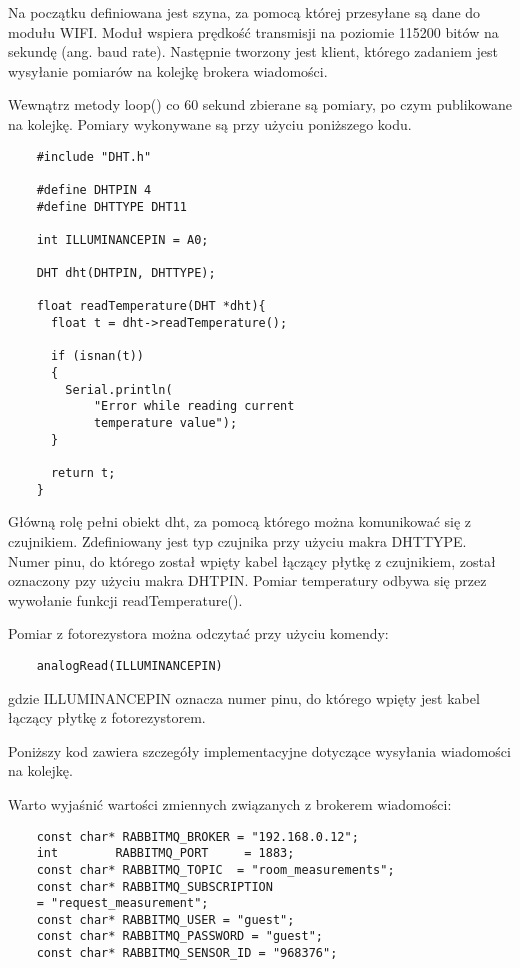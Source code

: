 Na początku definiowana jest szyna, za pomocą której przesyłane są dane do 
modułu WIFI. Moduł wspiera prędkość transmisji na poziomie 115200 bitów na 
sekundę (ang. baud rate). Następnie tworzony jest klient, którego zadaniem
jest wysyłanie pomiarów na kolejkę brokera wiadomości. 

Wewnątrz metody loop() co 60 sekund zbierane są pomiary, po czym publikowane
na kolejkę. Pomiary wykonywane są przy użyciu poniższego kodu.

\begin{lstlisting}
    #include "DHT.h"

    #define DHTPIN 4
    #define DHTTYPE DHT11
    
    int ILLUMINANCEPIN = A0;
    
    DHT dht(DHTPIN, DHTTYPE);
    
    float readTemperature(DHT *dht){
      float t = dht->readTemperature();
     
      if (isnan(t))
      {
        Serial.println(
            "Error while reading current 
            temperature value");
      }
      
      return t;
    }
\end{lstlisting}

Główną rolę pełni obiekt dht, za pomocą którego można komunikować się
z czujnikiem. Zdefiniowany jest typ czujnika przy użyciu makra DHTTYPE.
Numer pinu, do którego został wpięty kabel łączący płytkę z czujnikiem,
został oznaczony pzy użyciu makra DHTPIN. Pomiar temperatury odbywa się
przez wywołanie funkcji readTemperature(). 

Pomiar z fotorezystora można odczytać przy użyciu komendy:  

\begin{lstlisting}
    analogRead(ILLUMINANCEPIN)
\end{lstlisting}

gdzie ILLUMINANCEPIN oznacza numer pinu, do 
którego wpięty jest kabel łączący płytkę z fotorezystorem.

Poniższy kod zawiera szczegóły implementacyjne dotyczące 
wysyłania wiadomości na kolejkę.



Warto wyjaśnić wartości zmiennych związanych z brokerem wiadomości:
\begin{lstlisting}
    const char* RABBITMQ_BROKER = "192.168.0.12";
    int        RABBITMQ_PORT     = 1883;
    const char* RABBITMQ_TOPIC  = "room_measurements";
    const char* RABBITMQ_SUBSCRIPTION  
    = "request_measurement";
    const char* RABBITMQ_USER = "guest";
    const char* RABBITMQ_PASSWORD = "guest";
    const char* RABBITMQ_SENSOR_ID = "968376";
\end{lstlisting}

